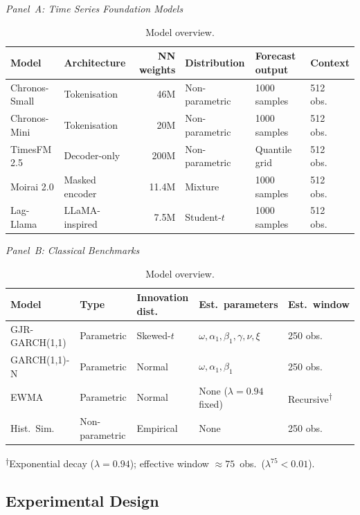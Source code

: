 \documentclass[preprint,11pt,authoryear]{elsarticle}
\newcommand{\1}{\boldsymbol{1}}
\begin{document}
	\begin{table}[H]
		\centering
		\scriptsize
		\caption{Model overview.}
		\label{tab:models}
		
		\medskip
		\textit{Panel~A: Time Series Foundation Models}
		\smallskip
		
		\begin{tabular}{@{}llrlll@{}}
			\toprule
			Model & Architecture & NN weights
			& Distribution & Forecast output & Context \\
			\midrule
			Chronos-Small  & Tokenisation   & 46M
			& Non-parametric & 1000 samples  & 512 obs.\ \\
			Chronos-Mini   & Tokenisation   & 20M
			& Non-parametric & 1000 samples  & 512 obs.\ \\
			TimesFM 2.5    & Decoder-only   & 200M
			& Non-parametric & Quantile grid & 512 obs.\ \\
			Moirai 2.0     & Masked encoder & 11.4M
			& Mixture        & 1000 samples  & 512 obs.\ \\
			Lag-Llama      & LLaMA-inspired & 7.5M
			& Student-$t$    & 1000 samples  & 512 obs.\ \\
			\bottomrule
		\end{tabular}
		
		\bigskip
		\textit{Panel~B: Classical Benchmarks}
		\smallskip
		
		\begin{tabular}{@{}lllll@{}}
			\toprule
			Model & Type & Innovation dist.\
			& Est.\ parameters & Est.\ window \\
			\midrule
			GJR-GARCH(1,1) & Parametric & Skewed-$t$
			& $\omega,\alpha_1,\beta_1,\gamma,\nu,\xi$
			& 250 obs.\ \\
			GARCH(1,1)-N   & Parametric & Normal
			& $\omega,\alpha_1,\beta_1$
			& 250 obs.\ \\
			EWMA           & Parametric & Normal
			& None ($\lambda = 0.94$ fixed)
			& Recursive\textsuperscript{$\dagger$} \\
			Hist.\ Sim.    & Non-parametric & Empirical
			& None
			& 250 obs.\ \\
			\bottomrule
		\end{tabular}
		
		\smallskip
		{\footnotesize
			\textsuperscript{$\dagger$}Exponential decay
			($\lambda = 0.94$); effective window
			$\approx 75$~obs.\ ($\lambda^{75} < 0.01$).}
	\end{table}
	
	\subsection{Experimental Design}
	
\end{document}
